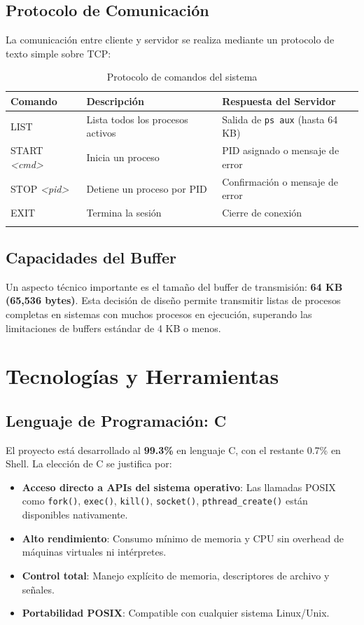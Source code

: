 \documentclass[12pt,a4paper]{report}
\begin{document}
\section{Protocolo de Comunicación}

La comunicación entre cliente y servidor se realiza mediante un protocolo de texto simple sobre TCP:

\begin{longtable}{>{\ttfamily}p{4cm} p{4.5cm} p{5cm}}
  \toprule
  \textbf{Comando} & \textbf{Descripción} & \textbf{Respuesta del Servidor} \\
  \midrule
  \endhead
  LIST & Lista todos los procesos activos & Salida de \texttt{ps aux} (hasta 64 KB) \\
  START \textit{<cmd>} & Inicia un proceso & PID asignado o mensaje de error \\
  STOP \textit{<pid>} & Detiene un proceso por PID & Confirmación o mensaje de error \\
  EXIT & Termina la sesión & Cierre de conexión \\
  \bottomrule
  \caption{Protocolo de comandos del sistema}
\end{longtable}

\section{Capacidades del Buffer}

Un aspecto técnico importante es el tamaño del buffer de transmisión: \textbf{64 KB (65,536 bytes)}. Esta decisión de diseño permite transmitir listas de procesos completas en sistemas con muchos procesos en ejecución, superando las limitaciones de buffers estándar de 4 KB o menos.

\chapter{Tecnologías y Herramientas}

\section{Lenguaje de Programación: C}

El proyecto está desarrollado al \textbf{99.3\%} en lenguaje C, con el restante 0.7\% en Shell. La elección de C se justifica por:

\begin{itemize}[leftmargin=1.5em]
  \item \textbf{Acceso directo a APIs del sistema operativo}: Las llamadas POSIX como \texttt{fork()}, \texttt{exec()}, \texttt{kill()}, \texttt{socket()}, \texttt{pthread\_create()} están disponibles nativamente.
  \item \textbf{Alto rendimiento}: Consumo mínimo de memoria y CPU sin overhead de máquinas virtuales ni intérpretes.
  \item \textbf{Control total}: Manejo explícito de memoria, descriptores de archivo y señales.
  \item \textbf{Portabilidad POSIX}: Compatible con cualquier sistema Linux/Unix.
\end{itemize}
\end{document}
